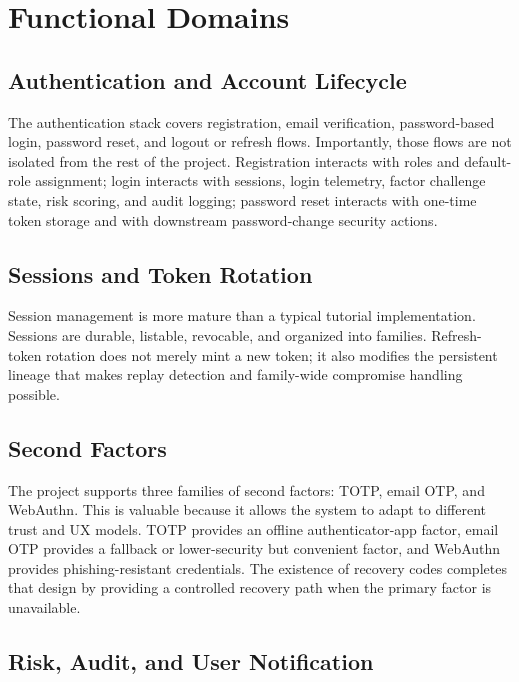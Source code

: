 \documentclass[11pt,a4paper]{article}
\begin{document}
\section{Functional Domains}

\subsection{Authentication and Account Lifecycle}

The authentication stack covers registration, email verification, password-based login, password reset, and logout or refresh flows. Importantly, those flows are not isolated from the rest of the project. Registration interacts with roles and default-role assignment; login interacts with sessions, login telemetry, factor challenge state, risk scoring, and audit logging; password reset interacts with one-time token storage and with downstream password-change security actions.

\subsection{Sessions and Token Rotation}

Session management is more mature than a typical tutorial implementation. Sessions are durable, listable, revocable, and organized into families. Refresh-token rotation does not merely mint a new token; it also modifies the persistent lineage that makes replay detection and family-wide compromise handling possible.

\subsection{Second Factors}

The project supports three families of second factors: TOTP, email OTP, and WebAuthn. This is valuable because it allows the system to adapt to different trust and UX models. TOTP provides an offline authenticator-app factor, email OTP provides a fallback or lower-security but convenient factor, and WebAuthn provides phishing-resistant credentials. The existence of recovery codes completes that design by providing a controlled recovery path when the primary factor is unavailable.

\subsection{Risk, Audit, and User Notification}
\end{document}
